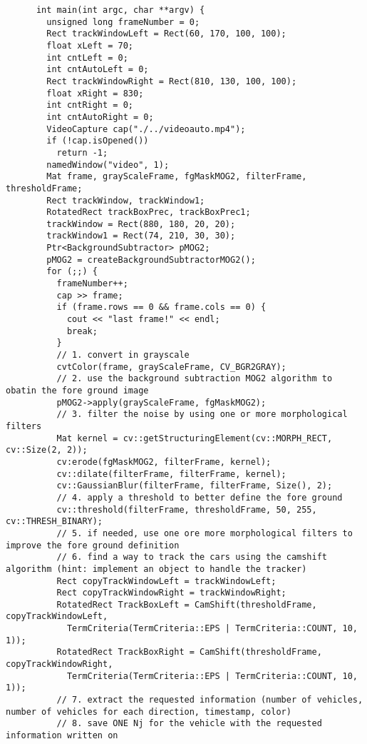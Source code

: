 \documentclass[8pt,a4paper]{article}
\begin{document}
\begin{multicols}{5}
\begin{verbatim}
      int main(int argc, char **argv) {
        unsigned long frameNumber = 0;
        Rect trackWindowLeft = Rect(60, 170, 100, 100);
        float xLeft = 70;
        int cntLeft = 0;
        int cntAutoLeft = 0;
        Rect trackWindowRight = Rect(810, 130, 100, 100);
        float xRight = 830;
        int cntRight = 0;
        int cntAutoRight = 0;
        VideoCapture cap("./../videoauto.mp4");
        if (!cap.isOpened())
          return -1;
        namedWindow("video", 1);
        Mat frame, grayScaleFrame, fgMaskMOG2, filterFrame, thresholdFrame;
        Rect trackWindow, trackWindow1;
        RotatedRect trackBoxPrec, trackBoxPrec1;
        trackWindow = Rect(880, 180, 20, 20);
        trackWindow1 = Rect(74, 210, 30, 30);
        Ptr<BackgroundSubtractor> pMOG2;
        pMOG2 = createBackgroundSubtractorMOG2();
        for (;;) {
          frameNumber++;
          cap >> frame;
          if (frame.rows == 0 && frame.cols == 0) {
            cout << "last frame!" << endl;
            break;
          } 
          // 1. convert in grayscale 
          cvtColor(frame, grayScaleFrame, CV_BGR2GRAY);
          // 2. use the background subtraction MOG2 algorithm to obatin the fore ground image 
          pMOG2->apply(grayScaleFrame, fgMaskMOG2);
          // 3. filter the noise by using one or more morphological filters 
          Mat kernel = cv::getStructuringElement(cv::MORPH_RECT, cv::Size(2, 2));
          cv:erode(fgMaskMOG2, filterFrame, kernel);
          cv::dilate(filterFrame, filterFrame, kernel);
          cv::GaussianBlur(filterFrame, filterFrame, Size(), 2);
          // 4. apply a threshold to better define the fore ground  
          cv::threshold(filterFrame, thresholdFrame, 50, 255, cv::THRESH_BINARY);
          // 5. if needed, use one ore more morphological filters to improve the fore ground definition
          // 6. find a way to track the cars using the camshift algorithm (hint: implement an object to handle the tracker)
          Rect copyTrackWindowLeft = trackWindowLeft;
          Rect copyTrackWindowRight = trackWindowRight;
          RotatedRect TrackBoxLeft = CamShift(thresholdFrame, copyTrackWindowLeft,
            TermCriteria(TermCriteria::EPS | TermCriteria::COUNT, 10, 1));
          RotatedRect TrackBoxRight = CamShift(thresholdFrame, copyTrackWindowRight,
            TermCriteria(TermCriteria::EPS | TermCriteria::COUNT, 10, 1));
          // 7. extract the requested information (number of vehicles, number of vehicles for each direction, timestamp, color)
          // 8. save ONE Nj for the vehicle with the requested information written on

\end{verbatim}
\end{multicols}
\end{document}
